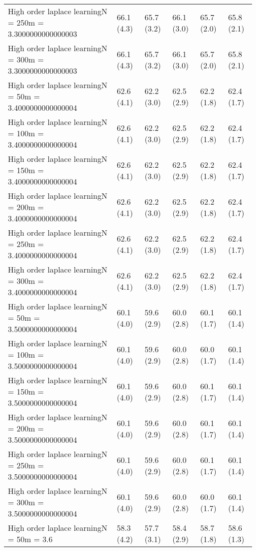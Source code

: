 \documentclass{article}
\begin{document}
\begin{table*}[t!]
\begin{center}
\begin{small}
\begin{sc}
\begin{tabular}{llllll}
High order laplace learningN = 250m = 3.3000000000000003&66.1 (4.3)      &65.7 (3.2)      &66.1 (3.0)      &65.7 (2.0)      &65.8 (2.1)      \\
High order laplace learningN = 300m = 3.3000000000000003&66.1 (4.3)      &65.7 (3.2)      &66.1 (3.0)      &65.7 (2.0)      &65.8 (2.1)      \\
High order laplace learningN = 50m = 3.4000000000000004&62.6 (4.1)      &62.2 (3.0)      &62.5 (2.9)      &62.2 (1.8)      &62.4 (1.7)      \\
High order laplace learningN = 100m = 3.4000000000000004&62.6 (4.1)      &62.2 (3.0)      &62.5 (2.9)      &62.2 (1.8)      &62.4 (1.7)      \\
High order laplace learningN = 150m = 3.4000000000000004&62.6 (4.1)      &62.2 (3.0)      &62.5 (2.9)      &62.2 (1.8)      &62.4 (1.7)      \\
High order laplace learningN = 200m = 3.4000000000000004&62.6 (4.1)      &62.2 (3.0)      &62.5 (2.9)      &62.2 (1.8)      &62.4 (1.7)      \\
High order laplace learningN = 250m = 3.4000000000000004&62.6 (4.1)      &62.2 (3.0)      &62.5 (2.9)      &62.2 (1.8)      &62.4 (1.7)      \\
High order laplace learningN = 300m = 3.4000000000000004&62.6 (4.1)      &62.2 (3.0)      &62.5 (2.9)      &62.2 (1.8)      &62.4 (1.7)      \\
High order laplace learningN = 50m = 3.5000000000000004&60.1 (4.0)      &59.6 (2.9)      &60.0 (2.8)      &60.1 (1.7)      &60.1 (1.4)      \\
High order laplace learningN = 100m = 3.5000000000000004&60.1 (4.0)      &59.6 (2.9)      &60.0 (2.8)      &60.0 (1.7)      &60.1 (1.4)      \\
High order laplace learningN = 150m = 3.5000000000000004&60.1 (4.0)      &59.6 (2.9)      &60.0 (2.8)      &60.1 (1.7)      &60.1 (1.4)      \\
High order laplace learningN = 200m = 3.5000000000000004&60.1 (4.0)      &59.6 (2.9)      &60.0 (2.8)      &60.1 (1.7)      &60.1 (1.4)      \\
High order laplace learningN = 250m = 3.5000000000000004&60.1 (4.0)      &59.6 (2.9)      &60.0 (2.8)      &60.1 (1.7)      &60.1 (1.4)      \\
High order laplace learningN = 300m = 3.5000000000000004&60.1 (4.0)      &59.6 (2.9)      &60.0 (2.8)      &60.0 (1.7)      &60.1 (1.4)      \\
High order laplace learningN = 50m = 3.6&58.3 (4.2)      &57.7 (3.1)      &58.4 (2.9)      &58.7 (1.8)      &58.6 (1.3)      \\

\end{tabular}
\end{sc}
\end{small}
\end{center}
\end{table*}
\end{document}
